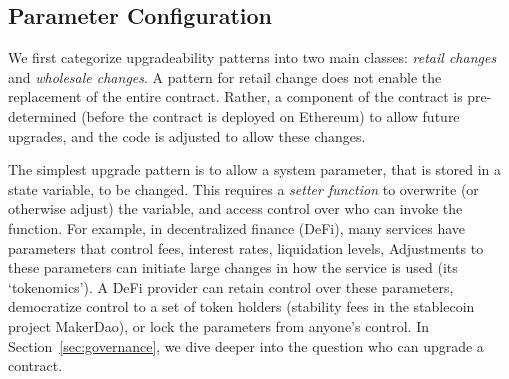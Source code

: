 

\subsection{Parameter Configuration}
\label{sec:parameter}

We first categorize upgradeability patterns into two main classes: \textit{retail changes} and \textit{wholesale changes}. A pattern for retail change does not enable the replacement of the entire contract. Rather, a component of the contract is pre-determined (before the contract is deployed on Ethereum) to allow future upgrades, and the code is adjusted to allow these changes. 

The simplest upgrade pattern is to allow a system parameter, that is stored in a state variable, to be changed. This requires a \textit{setter function} to overwrite (or otherwise adjust) the variable, and access control over who can invoke the function. For example, in decentralized finance (DeFi), many services have parameters that control fees, interest rates, liquidation levels, \etc Adjustments to these parameters can initiate large changes in how the service is used (its `tokenomics'). A DeFi provider can retain control over these parameters, democratize control to a set of token holders (\eg stability fees in the stablecoin project MakerDao), or lock the parameters from anyone's control. In Section~\ref{sec:governance}, we dive deeper into the question who can upgrade a contract. 

